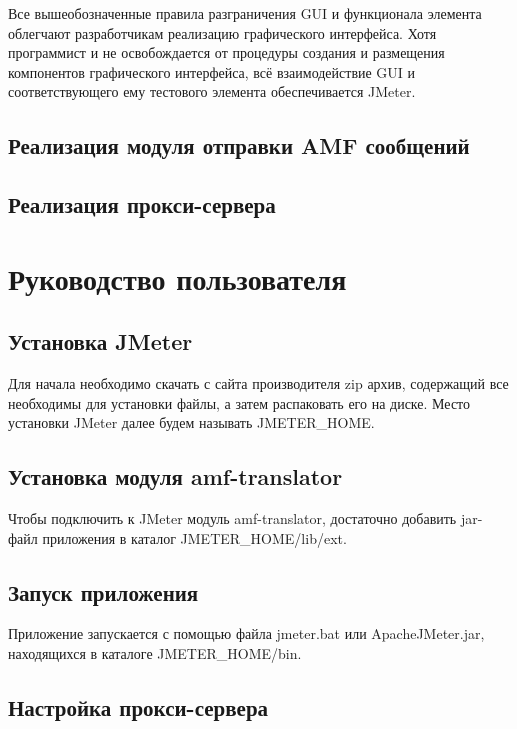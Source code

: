 Все вышеобозначенные правила разграничения GUI и функционала элемента облегчают разработчикам реализацию графического
интерфейса. Хотя программист и не освобождается от процедуры создания и размещения компонентов графического
интерфейса, всё взаимодействие GUI и соответствующего ему тестового элемента обеспечивается JMeter.

\subsection{Реализация модуля отправки AMF сообщений}



\subsection{Реализация прокси-сервера}

\section{Руководство пользователя}

\subsection{Установка JMeter}

Для начала необходимо скачать с сайта производителя zip архив, содержащий все необходимы для установки файлы,
а затем распаковать его на диске. Место установки JMeter далее будем называть JMETER\_HOME.

\subsection{Установка модуля amf-translator}

Чтобы подключить к JMeter модуль amf-translator, достаточно добавить jar-файл приложения в каталог JMETER\_HOME/lib/ext.

\subsection{Запуск приложения}

Приложение запускается с помощью файла jmeter.bat или ApacheJMeter.jar, находящихся в каталоге JMETER\_HOME/bin.

\subsection{Настройка прокси-сервера}

